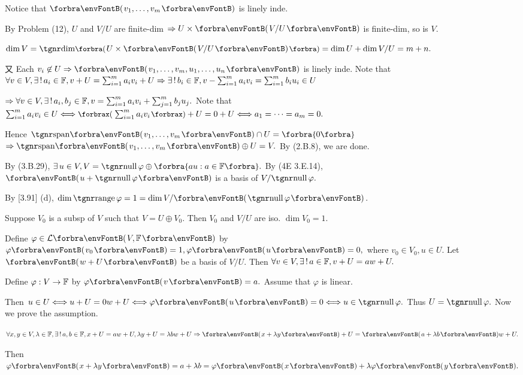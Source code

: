 \documentclass[a4paper, 11pt, UTF8]{article}
\begin{document}
\begin{large}
Notice that $\Par{v_1,\dots,v_m}$ is linely inde.\par\quad
By Problem (12), $U$ and $V/U$ are finite-dim $\Rightarrow U\times\Par{V/U}$ is finite-dim, so is $V$.\par\quad
$\dim V=\Dim\BigPar{U\times\Par{V/U}}=\dim U+\dim V/U=m+n.$\par\quad
又 Each $v_i\not\in U\Rightarrow\Par{v_1,\dots,v_m,u_1,\dots,u_n}$ is linely inde.\PfEnd\vspace{8pt}\quad
\Or Note that $\forall v\in V,\exists\,!\,a_i\in{\mathbb{F}},v+U=\sum_{i=1}^m a_i v_i+U\Rightarrow\exists\,!\,b_i\in{\mathbb{F}},v-\sum_{i=1}^m a_i v_i=\sum_{i=1}^m b_i u_i\in U$\vspace{4pt}\par\quad
{} $\Rightarrow \forall v\in V,\exists\,!\,a_i,b_j\in{\mathbb{F}},v=\sum_{i=1}^m a_i v_i+\sum_{j=1}^m b_j u_j.$\PfEnd\vspace{8pt}\quad
\Or Note that $\sum_{i=1}^m a_i v_i\in U\Longleftrightarrow\XPar{\sum_{i=1}^m a_i v_i}+U=0+U\Longleftrightarrow a_1=\dots=a_m=0.$\vspace{4pt}\par\quad
Hence $\Span{v_1,\dots,v_m}\cap U=\zeroSubs$
$\Rightarrow\Span{v_1,\dots,v_m}\oplus U=V.$ By (2.B.8), we are done.\PfEnd
\SepLine

\par\quad
By (3.B.29), $\exists\,u\in V,V=\null\varphi\oplus\Bra{au:a\in\Fbb}.$ By (4E 3.E.14), $\Par{u+\null\varphi}$ is a basis of $V/\null\varphi.$\par\quad
\Or By [3.91] (d), $\dim\range\varphi=1=\dim V/\Par{\null \varphi}$.\PfEnd
\SepLine

\par\quad
Suppose $V_0$ is a subsp of $V$ such that $V=U\oplus V_0.$ Then $V_0$ and $V/U$ are iso. $\dim V_0=1.$\par\quad
Define $\varphi\in\Lm{V,\Fbb}$ by $\varphi\Par{v_0}=1,\varphi\Par{u}=0,$ where $v_0\in V_0,u\in U.$\PfEnd\vspace{6pt}\quad
\Or Let $\Par{w+U}$ be a basis of $V/U.$ Then $\forall v\in V,\exists\,!\,a\in{\mathbb{F}},v+U=aw+U.$\par\quad
Define $\varphi:{V\rightarrow{\mathbb{F}}}$ by $\varphi\Par{v}=a.$ Assume that $\varphi$ is linear.\par\quad
Then $u\in U\Longleftrightarrow u+U=0w+U\Longleftrightarrow\varphi\Par{u}=0\Longleftrightarrow u\in\null\varphi.$ Thus $U=\null\varphi.$\PfEnd\quad
Now we prove the assumption.\par\quad
$\forall x,y\in V,\lambda\in\Fbb,\exists\,!\,a,b\in\Fbb,x+U=a w+U,\lambda y+U=\lambda b w+U\Rightarrow \Par{x+\lambda y}+U=\Par{a+\lambda b}w+U.$\par\quad
Then $\varphi\Par{x+\lambda y}=a+\lambda b=\varphi\Par{x}+\lambda\varphi\Par{y}.$
\SepLine


\end{large}
\end{document}

